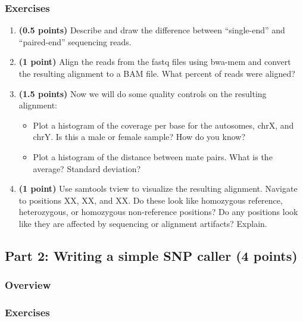 \documentclass[12pt]{article}
\begin{document}
\subsubsection*{Exercises}
\begin{enumerate}
\item \textbf{(0.5 points)} Describe and draw the difference between ``single-end'' and ``paired-end'' sequencing reads.

\item \textbf{(1 point)} Align the reads from the fastq files using bwa-mem and convert the resulting alignment to a BAM file. What percent of reads were aligned?

\item \textbf{(1.5 points)} Now we will do some quality controls on the resulting alignment:
\begin{itemize}
	\item Plot a histogram of the coverage per base for the autosomes, chrX, and chrY. Is this a male or female sample? How do you know?
	\item Plot a histogram of the distance between mate pairs. What is the average? Standard deviation?
\end{itemize}

\item \textbf{(1 point)} Use samtools tview to visualize the resulting alignment. Navigate to positions XX, XX, and XX. Do these look like homozygous reference, heterozygous, or homozygous non-reference positions? Do any positions look like they are affected by sequencing or alignment artifacts? Explain.

\end{enumerate}

\subsection*{Part 2: Writing a simple SNP caller (4 points)}
\subsubsection*{Overview}
\subsubsection*{Exercises}
\end{document}
